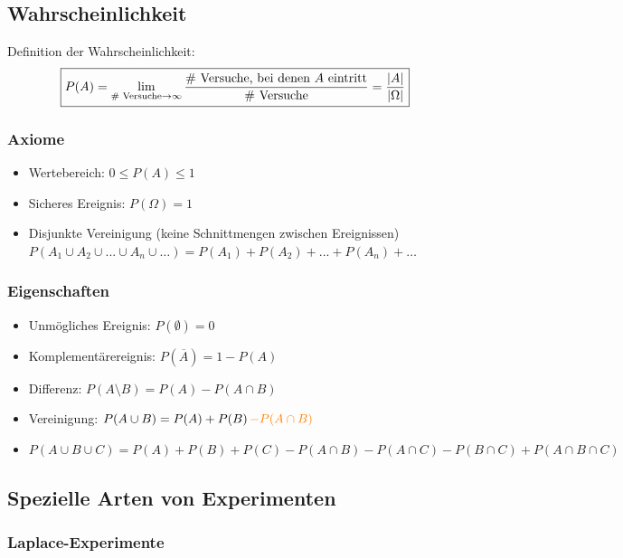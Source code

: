 \subsection{Wahrscheinlichkeit}

Definition der Wahrscheinlichkeit:
$$ \boxed{ P(A) = \lim\limits_{\text{\# Versuche} \to \infty} \frac{\text{\# Versuche, bei denen $A$ eintritt}}{\text{\# Versuche}}  = \frac{\left|A\right|}{\left|\Omega\right|}} $$


\subsubsection{Axiome}

\begin{itemize}
	\item Wertebereich: $0 \leq P(A) \leq 1$ 
	\item Sicheres Ereignis: $P(\Omega) = 1$ 
	\item Disjunkte Vereinigung (keine Schnittmengen zwischen Ereignissen)\\
	$P(A_1 \cup A_2\cup ... \cup A_n \cup \dots) =  P(A_1) + P(A_2) + ... + P(A_n) + \dots$ 
\end{itemize}


\subsubsection{Eigenschaften}

\begin{itemize}
	\item Unmögliches Ereignis: $P(\emptyset) = 0$ 
	\item Komplementärereignis: $P(\overline{A}) = 1 - P(A)$
	\item Differenz: $P(A \setminus B) = P(A) - P(A \cap B)$
	\item Vereinigung: $P(A \cup B) = P(A) + P(B) \, {\color{orange}- P(A \cap B)}$
	\item $P(A \cup B \cup C) = P(A) + P(B) + P(C) - P(A \cap B) - P(A \cap C) - P(B \cap C) + P(A \cap B \cap C)$
\end{itemize}


\subsection{Spezielle Arten von Experimenten}

\subsubsection{Laplace-Experimente}

